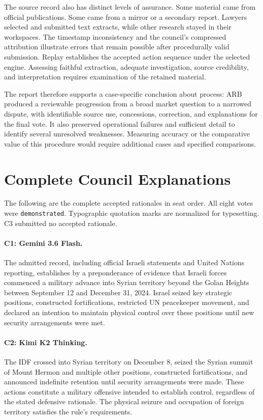 \documentclass[11pt]{article}
\newcommand{\code}[1]{\texttt{#1}}
\begin{document}
The source record also has distinct levels of assurance.  Some material came from official publications.  Some came from a mirror or a secondary report.  Lawyers selected and submitted text extracts, while other research stayed in their workspaces.  The timestamp inconsistency and the council's compressed attribution illustrate errors that remain possible after procedurally valid submission.  Replay establishes the accepted action sequence under the selected engine.  Assessing faithful extraction, adequate investigation, source credibility, and interpretation requires examination of the retained material.

The report therefore supports a case-specific conclusion about process: ARB produced a reviewable progression from a broad market question to a narrowed dispute, with identifiable source use, concessions, correction, and explanations for the final vote.  It also preserved operational failures and sufficient detail to identify several unresolved weaknesses.  Measuring accuracy or the comparative value of this procedure would require additional cases and specified comparisons.

\appendix
\section{Complete Council Explanations}
\label{app:votes}

The following are the complete accepted rationales in seat order.  All eight votes were \code{demonstrated}.  Typographic quotation marks are normalized for typesetting.  C3 submitted no accepted rationale.

\paragraph{C1: Gemini 3.6 Flash.}
The admitted record, including official Israeli statements and United Nations reporting, establishes by a preponderance of evidence that Israeli forces commenced a military advance into Syrian territory beyond the Golan Heights between September 12 and December 31, 2024. Israel seized key strategic positions, constructed fortifications, restricted UN peacekeeper movement, and declared an intention to maintain physical control over these positions until new security arrangements were met.

\paragraph{C2: Kimi K2 Thinking.}
The IDF crossed into Syrian territory on December 8, seized the Syrian summit of Mount Hermon and multiple other positions, constructed fortifications, and announced indefinite retention until security arrangements were made. These actions constitute a military offensive intended to establish control, regardless of the stated defensive rationale. The physical seizure and occupation of foreign territory satisfies the rule's requirements.
\end{document}
